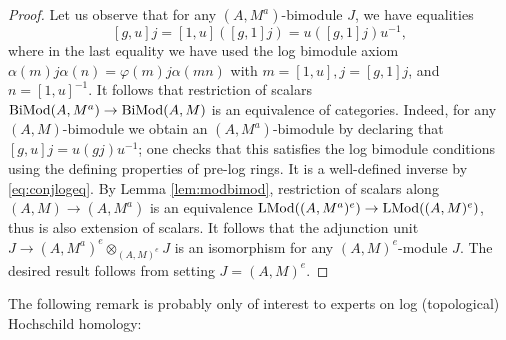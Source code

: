 \documentclass[a4paper,10pt%
]{amsart}
\numberwithin{equation}{section}
\theoremstyle{definition}
\renewcommand{\:}{\colon}
\begin{document}
\begin{proof} Let us observe that for any $(A, M^a)$-bimodule $J$, we have equalities \begin{equation}\label{eq:conjlogeq}[g, u]j = [1, u]([g, 1]j) = u([g, 1]j)u^{-1},\end{equation} where in the last equality we have used the log bimodule axiom $\alpha(m)j\alpha(n) = \varphi(m)j\alpha(mn)$ with $m = [1, u], j = [g, 1]j$, and $n = [1, u]^{-1}$. It follows that restriction of scalars ${\rm BiMod}(A, M^a) \to {\rm BiMod}(A, M)$ is an equivalence of categories. Indeed, for any $(A, M)$-bimodule we obtain an $(A, M^a)$-bimodule by declaring that $[g, u]j = u(gj)u^{-1}$; one checks that this satisfies the log bimodule conditions using the defining properties of pre-log rings. It is a well-defined inverse by \eqref{eq:conjlogeq}. By Lemma \ref{lem:modbimod}, restriction of scalars along $(A, M) \to (A, M^a)$ is an equivalence ${\rm LMod}((A, M^a)^e) \to {\rm LMod}((A, M)^e)$, thus is also extension of scalars. It follows that the adjunction unit $J \to (A, M^a)^e \otimes_{(A, M)^e} J$ is an isomorphism for any $(A, M)^e$-module $J$. The desired result follows from setting $J = (A, M)^e$.
\end{proof}

The following remark is probably only of interest to experts on log (topological) Hochschild homology: 
\end{document}
